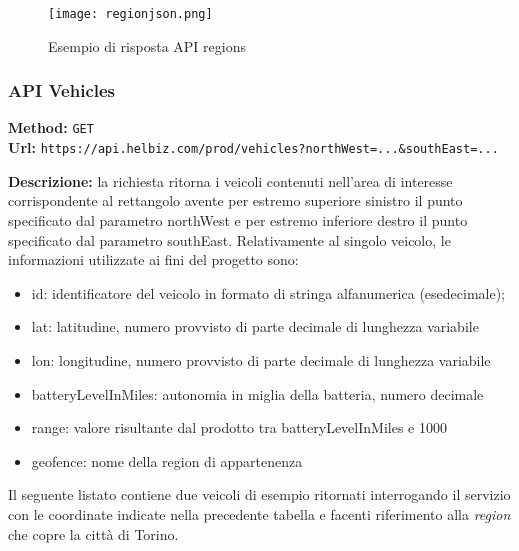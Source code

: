 \begin{figure}[H]
\centering
\texttt{[image: regionjson.png]}
\caption*{Esempio di risposta API regions}
\label{fig:footprint}
\end{figure}



\subsubsection{API Vehicles}

\textbf{Method:} \texttt{GET} \\
\textbf{Url:} \texttt{https://api.helbiz.com/prod/vehicles?northWest=...\&southEast=...} \\

\begin{table}[h]
\centering
{}
\end{table}

\noindent\textbf{Descrizione:} la richiesta ritorna i veicoli contenuti nell'area di interesse 
corrispondente al rettangolo avente per estremo superiore sinistro il punto specificato dal
parametro northWest e per estremo inferiore destro il punto specificato dal parametro southEast.
Relativamente al singolo veicolo, le informazioni utilizzate ai fini del progetto sono:
\begin{itemize}
\item id: identificatore del veicolo in formato di stringa alfanumerica (esedecimale);
\item lat: latitudine, numero provvisto di parte decimale di lunghezza variabile 
\item lon: longitudine, numero provvisto di parte decimale di lunghezza variabile
\item batteryLevelInMiles: autonomia in miglia della batteria, numero decimale 
\item range: valore risultante dal prodotto tra batteryLevelInMiles e 1000
\item geofence: nome della region di appartenenza
\end{itemize}
Il seguente listato contiene due veicoli di esempio ritornati interrogando il servizio
con le coordinate indicate nella precedente tabella e facenti riferimento alla \emph{region}
che copre la città di Torino.

